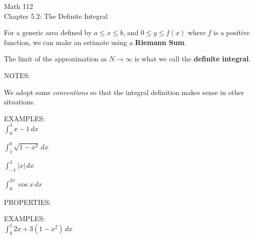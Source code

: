 \documentclass[11pt]{article}
\begin{document}
\begin{center}
\Large
\rm{Math 112}
\\
\rm{Chapter 5.2:  The Definite Integral}
\\
\end{center}
\vspace{0.2in}

For a generic area defined by $a \leq x \leq b$, and $0 \leq y \leq f(x)$  where $f$ is a positive function, we can make
an estimate using a {\bf Riemann Sum}.



\vspace{2.6in}


The limit of the approximation as $N\to\infty$ is what we call the {\bf definite integral}.\\

\vspace{2.5in}


NOTES:\\

\vspace{1.5in}

\pagebreak

We adopt some \emph{conventions} so that the integral definition makes sense in other situations.\\


\vspace{4.5in}

EXAMPLES:\\

$\int_0^3 x-1\,dx$

\vspace{2in}


$\int_1^0 \sqrt{1-x^2}\,dx$


\vspace{2.5in}


$\int_{-1}^3 |x|\,dx$


\vspace{1.5in}

$\int_{0}^{2\pi} \cos{x}\,dx$

\vspace{1in}

PROPERTIES:

\vspace{4in}

EXAMPLES:\\

$\int_{0}^{1}2x+3(1-x^2)\, dx$

\vspace{1.5in}
\end{document}
